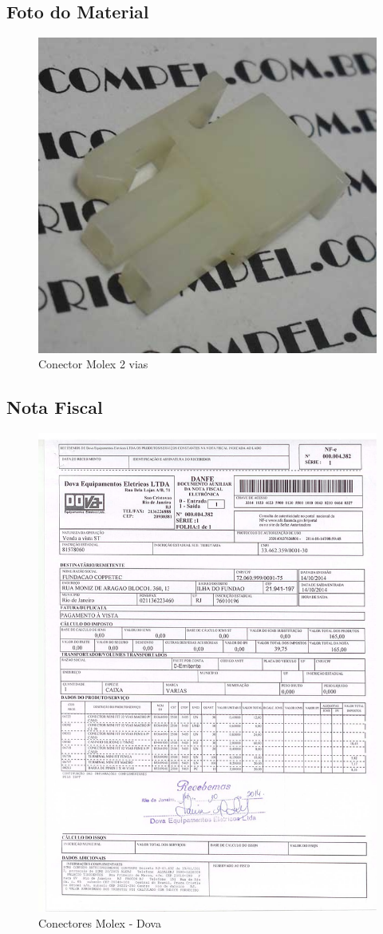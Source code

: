 \subsection{Foto do Material}
\begin{figure}[H]
 \centering
 \includegraphics[width=1\columnwidth]{Conectores_01/foto.jpg}
 \caption{Conector Molex 2 vias}
\end{figure}

\subsection{Nota Fiscal}
\begin{figure}[H]
 \centering
 \includegraphics[width=0.9\columnwidth]{Conectores_01/nota_dova.pdf}
 \caption{Conectores Molex - Dova}
 \end{figure}